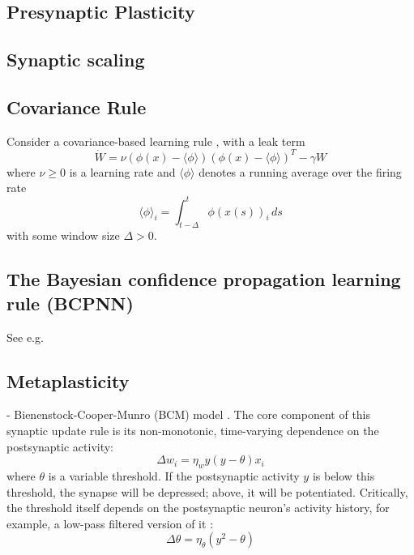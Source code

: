 \documentclass{article}
\theoremstyle{definition} \newtheorem{definition}{Definition}
\theoremstyle{remark} \newtheorem{remark}{Remark}
\newcounter{ct}
\begin{document}
\subsection{Presynaptic Plasticity}
\citep{mongillo2008synaptic}
\citep{masse2019circuit}

\subsection{Synaptic scaling}
\citep{renart2003robust}

\subsection{Covariance Rule}
\citep{amit1989modeling}
Consider a covariance-based learning rule \citep{sejnowski1989hebb, gerstner2002mathematical}, with a leak term  
\begin{equation}
    \dot{W} = \nu \left( \phi(x) - \langle \phi \rangle \right) \left( \phi(x) - \langle \phi \rangle \right)^T - \gamma W
\end{equation}
where $\nu \geq 0$ is a learning rate and $\langle \phi \rangle$ denotes a running average over the firing rate  
\begin{equation}
    \langle \phi \rangle_i = \int_{t-\Delta}^{t} \phi(x(s))_i \, ds
\end{equation}
with some window size $\Delta > 0$.

\subsection{The Bayesian confidence propagation learning rule (BCPNN)}
See e.g. \citep{lansner2023fast}

\subsection{Metaplasticity}
 - Bienenstock-Cooper-Munro (BCM) model \cite{bienenstock1982theory}. The core component of this synaptic update rule is its non-monotonic, time-varying dependence on the postsynaptic activity:  
\begin{equation}
    \Delta w_i = \eta_w y (y - \theta) x_i
\end{equation}
where $\theta$ is a variable threshold. If the postsynaptic activity $y$ is below this threshold, the synapse will be depressed; above, it will be potentiated. Critically, the threshold itself depends on the postsynaptic neuron’s activity history, for example, a low-pass filtered version of it \cite[Ch.~8.2]{dayan2005theoretical}:  
\begin{equation}
    \Delta \theta = \eta_\theta (y^2 - \theta)
\end{equation}
\end{document}
